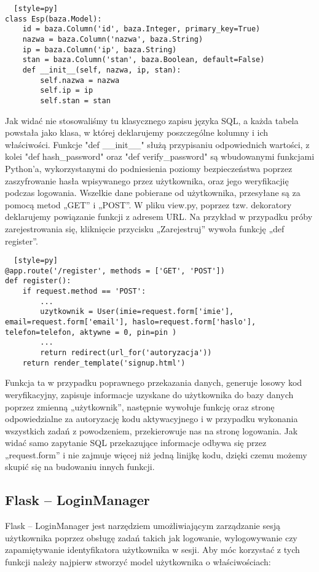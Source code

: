 \documentclass{xmgr}
\begin{document}
\begin{lstlisting}  [style=py] 
class Esp(baza.Model):
    id = baza.Column('id', baza.Integer, primary_key=True)
    nazwa = baza.Column('nazwa', baza.String)
    ip = baza.Column('ip', baza.String)
    stan = baza.Column('stan', baza.Boolean, default=False)
    def __init__(self, nazwa, ip, stan):
        self.nazwa = nazwa
        self.ip = ip
        self.stan = stan
\end{lstlisting}

Jak widać nie stosowaliśmy tu klasycznego zapisu języka SQL, a każda tabela powstała jako klasa, w której deklarujemy poszczególne kolumny i ich właściwości. Funkcje "def \_\_init\_\_" służą przypisaniu odpowiednich wartości, z kolei "def hash\_password" oraz "def verify\_password" są wbudowanymi funkcjami Python’a, wykorzystanymi do podniesienia poziomy bezpieczeństwa poprzez zaszyfrowanie hasła wpisywanego przez użytkownika, oraz jego weryfikacjię podczas logowania. Wszelkie dane pobierane od użytkownika, przesyłane są za pomocą metod „GET” i „POST”. W pliku view.py, poprzez tzw. dekoratory deklarujemy powiązanie funkcji z adresem URL. Na przykład w przypadku próby zarejestrowania się, kliknięcie przycisku „Zarejestruj” wywoła funkcję „def register”.

\begin{lstlisting}  [style=py] 
@app.route('/register', methods = ['GET', 'POST'])
def register():
    if request.method == 'POST':
        ...
        uzytkownik = User(imie=request.form['imie'], email=request.form['email'], haslo=request.form['haslo'], telefon=telefon, aktywne = 0, pin=pin )
        ...
        return redirect(url_for('autoryzacja'))
    return render_template('signup.html')
\end{lstlisting}

Funkcja ta w przypadku poprawnego przekazania danych, generuje losowy kod weryfikacyjny, zapisuje informacje uzyskane do użytkownika do bazy danych poprzez zmienną „użytkownik”, następnie wywołuje funkcję oraz stronę odpowiedzialne za autoryzację kodu aktywacyjnego i w przypadku wykonania wszystkich zadań z powodzeniem, przekierowuje nas na stronę logowania. Jak widać samo zapytanie SQL przekazujące informacje odbywa się przez „request.form” i nie zajmuje więcej niż jedną linijkę kodu, dzięki czemu możemy skupić się na budowaniu innych funkcji.

\subsection{Flask -- LoginManager}
Flask – LoginManager\cite{Frazier:2018:flask} jest narzędziem umożliwiającym zarządzanie sesją użytkownika poprzez obsługę zadań takich jak logowanie, wylogowywanie czy zapamiętywanie identyfikatora użytkownika w sesji. Aby móc korzystać z tych funkcji należy najpierw stworzyć model użytkownika o właściwościach: 
\end{document}
